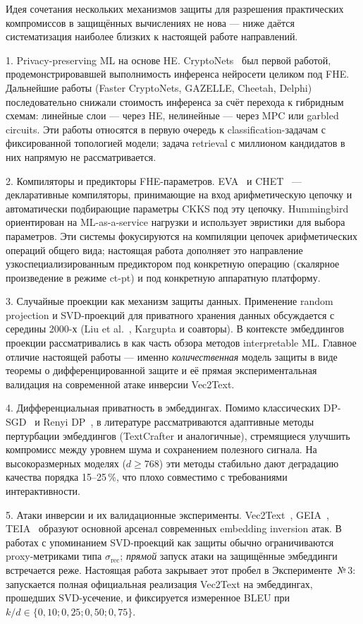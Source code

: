 \documentclass[a4paper, 12pt, oneside, openany]{article}
\begin{document}
Идея сочетания нескольких механизмов защиты для разрешения практических компромиссов в защищённых вычислениях не нова --- ниже даётся систематизация наиболее близких к настоящей работе направлений.

1. Privacy-preserving ML на основе HE. CryptoNets~\cite{ref50} был первой работой, продемонстрировавшей выполнимость инференса нейросети целиком под FHE. Дальнейшие работы (Faster CryptoNets, GAZELLE, Cheetah, Delphi) последовательно снижали стоимость инференса за счёт перехода к гибридным схемам: линейные слои --- через HE, нелинейные --- через MPC или garbled circuits. Эти работы относятся в первую очередь к classification-задачам с фиксированной топологией модели; задача retrieval с миллионом кандидатов в них напрямую не рассматривается.

2. Компиляторы и предикторы FHE-параметров. EVA~\cite{ref66} и CHET~\cite{ref67} --- декларативные компиляторы, принимающие на вход арифметическую цепочку и автоматически подбирающие параметры CKKS под эту цепочку. Hummingbird~\cite{ref68} ориентирован на ML-as-a-service нагрузки и использует эвристики для выбора параметров. Эти системы фокусируются на компиляции цепочек арифметических операций общего вида; настоящая работа дополняет это направление узкоспециализированным предиктором под конкретную операцию (скалярное произведение в режиме ct-pt) и под конкретную аппаратную платформу.

3. Случайные проекции как механизм защиты данных. Применение random projection и SVD-проекций для приватного хранения данных обсуждается с середины 2000-х (Liu et al.~\cite{ref63}, Kargupta и соавторы). В контексте эмбеддингов проекции рассматривались в \cite{ref64} как часть обзора методов interpretable ML. Главное отличие настоящей работы --- именно \emph{количественная} модель защиты в виде теоремы о дифференцированной защите и её прямая экспериментальная валидация на современной атаке инверсии Vec2Text.

4. Дифференциальная приватность в эмбеддингах. Помимо классических DP-SGD~\cite{ref52} и Renyi DP~\cite{ref53}, в литературе рассматриваются адаптивные методы пертурбации эмбеддингов (TextCrafter и аналогичные), стремящиеся улучшить компромисс между уровнем шума и сохранением полезного сигнала. На высокоразмерных моделях ($d \geq 768$) эти методы стабильно дают деградацию качества порядка 15--25\,\%, что плохо совместимо с требованиями интерактивности.

5. Атаки инверсии и их валидационные эксперименты. Vec2Text~\cite{ref5}, GEIA~\cite{ref7}, TEIA~\cite{ref8} образуют основной арсенал современных embedding inversion атак. В работах с упоминанием SVD-проекций как защиты обычно ограничиваются proxy-метриками типа $\sigma_{\mathrm{rec}}$; \emph{прямой} запуск атаки на защищённые эмбеддинги встречается реже. Настоящая работа закрывает этот пробел в Эксперименте~№\,3: запускается полная официальная реализация Vec2Text на эмбеддингах, прошедших SVD-усечение, и фиксируется измеренное BLEU при $k/d \in \{0{,}10; 0{,}25; 0{,}50; 0{,}75\}$.
\end{document}
